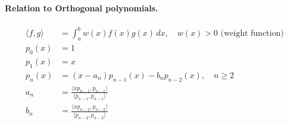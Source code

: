 \paragraph{Relation to Orthogonal polynomials.}
\begin{align*}
    \langle f, g \rangle & = \int_a^b w(x) f(x) g(x) \, dx , \quad w(x) > 0 \text{ (weight function)}    \\
    p_0(x)               & = 1                                                                           \\
    p_1(x)               & = x                                                                           \\
    p_n(x)               & = (x - a_n) p_{n-1}(x) - b_n p_{n-2}(x), \quad n \geq 2                       \\
    a_n                  & = \frac{\langle x p_{n-1}, p_{n-1} \rangle}{\langle p_{n-1}, p_{n-1} \rangle} \\
    b_n                  & = \frac{\langle x p_{n-2}, p_{n-2} \rangle}{\langle p_{n-2}, p_{n-2} \rangle}
\end{align*}
